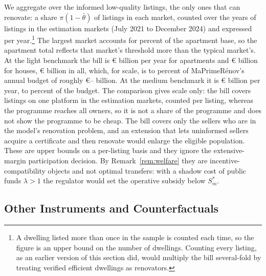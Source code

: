 \documentclass[10pt,letterpaper]{bp-template-concise}
\begin{document}
We aggregate over the informed low-quality listings, the only ones that can renovate: a share $\pi(1-\bar\theta)$ of listings in each market, counted over the \attSampleYears{} years of listings in the estimation markets (July 2021 to December 2024) and expressed per year.\footnote{A dwelling listed more than once in the sample is counted each time, so the figure is an upper bound on the number of dwellings. Counting every listing, as an earlier version of this section did, would multiply the bill several-fold by treating verified efficient dwellings as renovators.} The largest market accounts for \attTopMarketShareApt{} percent of the apartment base, so the apartment total reflects that market's threshold more than the typical market's. At the light benchmark the bill is \euro{}\attScBaseCostTwoFiftyApt{} billion per year for apartments and \euro{}\attScBaseCostTwoFiftyHouse{} billion for houses, \euro{}\attScCostBaseTotTwoFifty{} billion in all, which, for scale, is \attScCostBaseTotTwoFiftyLo{} to \attScCostBaseTotTwoFiftyHi{} percent of MaPrimeR\'enov's annual budget of roughly \euro{}\attBudgetLo{}--\attBudgetHi{} billion. %
At the medium benchmark it is \euro{}\attScCostBaseTotFiveHundred{} billion per year, \attScCostBaseTotFiveHundredLo{} to \attScCostBaseTotFiveHundredHi{} percent of the budget. The comparison gives scale only: the bill covers listings on one platform in the estimation markets, counted per listing, whereas the programme reaches all owners, so it is not a share of the programme and does not show the programme to be cheap. The bill covers only the sellers who are in the model's renovation problem, and an extension that lets uninformed sellers acquire a certificate and then renovate would enlarge the eligible population. These are upper bounds on a per-listing basis and they ignore the extensive-margin participation decision. By Remark~\ref{rem:welfare} they are incentive-compatibility objects and not optimal transfers: with a shadow cost of public funds $\lambda>1$ the regulator would set the operative subsidy below $S^*_m$.

\subsection{Other Instruments and Counterfactuals}
\label{ss:att_policy}
\end{document}
